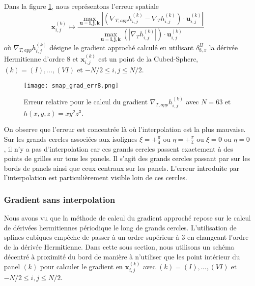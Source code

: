 Dans la figure \ref{fig:err_grad}, nous représentons l'erreur spatiale
\begin{equation}
\mathbf{x}_{i,j}^{(k)} \mapsto \dfrac{\max_{\mathbf{u}=\mathbf{i}, \mathbf{j}, \mathbf{k}} | \left( \nabla_{T,app} h_{i,j}^{(k)} - \nabla_T h_{i,j}^{(k)} \right)\cdot \mathbf{u}_{i,j}^{(k)} | }{\max_{\mathbf{u}=\mathbf{i}, \mathbf{j}, \mathbf{k}} \left(  | \nabla_T h_{i,j}^{(k)} |\right)\cdot \mathbf{u}_{i,j}^{(k)}}
\end{equation}
où $\nabla_{T,app} h_{i,j}^{(k)}$ désigne le gradient approché calculé en utilisant $\delta_{8,x}^H$ la dérivée Hermitienne d'ordre 8 et $\mathbf{x}_{i,j}^{(k)}$ est un point de la Cubed-Sphere, $(k)= (I), \ldots , (VI)$ et $-N/2 \leq i,j \leq N/2$.
\begin{figure}[htbp]
\begin{center}
\texttt{[image: snap\_grad\_err8.png]}
\end{center}
\caption{Erreur relative pour le calcul du gradient $\nabla_{T,app} h_{i,j}^{(k)}$ avec $N=63$ et $h(x,y,z)=x y^2 z^3$. }
\label{fig:err_grad}
\end{figure}
On observe que l'erreur est concentrée là où l'interpolation est la plus mauvaise. Sur les grands cercles associées aux isolignes $\xi = \pm \frac{\pi}{4}$ ou $\eta = \pm \frac{\pi}{4}$ ou $\xi = 0$ ou $\eta = 0$, il n'y a pas d'interpolation car ces grands cercles passent exactement à des points de grilles sur tous les panels. Il s'agit des grands cercles passant par sur les bords de panels ainsi que ceux centraux sur les panels. L'erreur introduite par l'interpolation est particulièrement visible loin de ces cercles.













\subsubsection{Gradient sans interpolation}

Nous avons vu que la méthode de calcul du gradient approché repose sur le calcul de dérivées hermitiennes périodique le long de grands cercles. L'utilisation de splines cubiques empêche de passer à un ordre supérieur à 3 en changeant l'ordre de la dérivée Hermitienne. Dans cette sous section, nous utilisons un schéma décentré à proximité du bord de manière à n'utiliser que les point intérieur du panel $(k)$ pour calculer le gradient en $\mathbf{x}_{i,j}^{(k)}$ avec $(k) = (I), \ldots ,(VI)$ et $-N/2 \leq i,j \leq N/2$.

